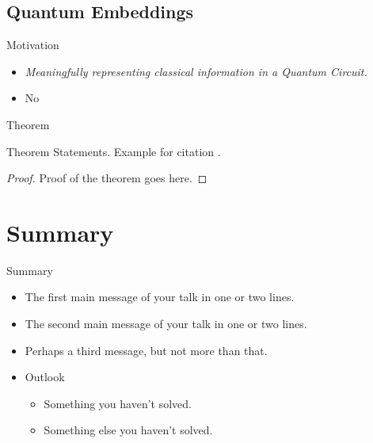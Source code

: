 \documentclass[xcolor=dvipsnames]{beamer}
\begin{document}
\subsection{Quantum Embeddings}
\begin{frame}{Motivation}
\begin{itemize}
    \item \em{Meaningfully} representing classical information in a Quantum Circuit.
    \item<2> {
    No 
    }
\end{itemize}

\end{frame}

\begin{frame}{Theorem}
\begin{theorem}
Theorem Statements. Example for citation \cite{Author1990}.
\end{theorem}

\begin{proof}
Proof of the theorem goes here.
\end{proof}
\end{frame}

\section*{Summary}

\begin{frame}{Summary}
  \begin{itemize}
  \item
    The \alert{first main message} of your talk in one or two lines.
  \item
    The \alert{second main message} of your talk in one or two lines.
  \item
    Perhaps a \alert{third message}, but not more than that.
  \end{itemize}
  
  \begin{itemize}
  \item
    Outlook
    \begin{itemize}
    \item
      Something you haven't solved.
    \item
      Something else you haven't solved.
    \end{itemize}
  \end{itemize}
\end{frame}
\end{document}
